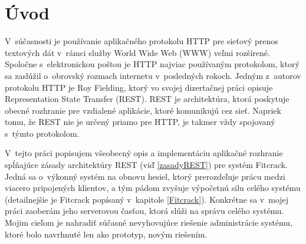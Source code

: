 \documentclass[slovak]{fitthesis}
\begin{document}
  \maketitle
  \setlength{\parskip}{0pt}

  {\hypersetup{hidelinks}\tableofcontents}
  
  \ifczech
    \renewcommand\listfigurename{Seznam obrázků}
  \fi
  \ifslovak
    \renewcommand\listfigurename{Zoznam obrázkov}
  \fi
  
  \ifczech
    \renewcommand\listtablename{Seznam tabulek}
  \fi
  \ifslovak
    \renewcommand\listtablename{Zoznam tabuliek}
  \fi

  \ifODSAZ
    \setlength{\parskip}{0.5\bigskipamount}
  \else
    \setlength{\parskip}{0pt}
  \fi

  \iftwoside
    \cleardoublepage
  \fi


\chapter{Úvod}\label{uvod}
V~súčasnosti je používanie aplikačného protokolu HTTP pre sieťový prenos textových dát v~rámci služby World Wide Web (WWW) veľmi rozšírené. Spoločne s~elektronickou poštou je HTTP najviac používaným protokolom, ktorý sa zaslúžil o~obrovský rozmach internetu v~posledných rokoch. Jedným z~autorov protokolu HTTP je Roy Fielding, ktorý vo svojej dizertačnej práci opisuje Representation State Transfer (REST). REST je architektúra, ktorá poskytuje obecné rozhranie pre vzdialené aplikácie, ktoré komunikujú cez sieť. Napriek tomu, že REST nie je určený priamo pre HTTP, je takmer vždy spojovaný s~týmto protokolom.

V~tejto práci popisujem všeobecný opis a implementáciu aplikačné rozhranie spĺňajúce zásady architektúry REST (viď \ref{zasadyREST}) pre systém Fitcrack. Jedná sa o~výkonný systém na obnovu hesiel, ktorý prerozdeľuje prácu medzi viacero pripojených klientov, a tým pádom zvyšuje výpočetnú silu celého systému (detailnejšie je Fitcrack popísaný v~kapitole \ref{Fitcrack}). Konkrétne sa v~mojej práci zaoberám jeho serverovou časťou, ktorá slúži na správu celého systému. Mojim cieľom je nahradiť súčasné nevyhovujúce riešenie administrácie systému, ktoré bolo navrhnuté len ako prototyp, novým riešením.
\end{document}
